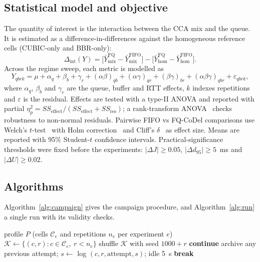 \documentclass[conference]{IEEEtran}
\newcommand{\dq}[1]{d_{#1}}
\begin{document}
\subsection{Statistical model and objective}
\label{sec:stats}
The quantity of interest is the interaction between the CCA mix and the queue. It is estimated as a difference-in-differences against the homogeneous reference cells (CUBIC-only and BBR-only):
\begin{equation}
\Delta_{\mathrm{int}}(Y) = \big[\bar{Y}_{\mathrm{mix}}^{\mathrm{FQ}} - \bar{Y}_{\mathrm{mix}}^{\mathrm{FIFO}}\big] - \big[\bar{Y}_{\mathrm{hom}}^{\mathrm{FQ}} - \bar{Y}_{\mathrm{hom}}^{\mathrm{FIFO}}\big]. \label{eq:did}
\end{equation}
Across the regime sweep, each metric is modelled as
\begin{equation}
Y_{qbrk} = \mu + \alpha_q + \beta_b + \gamma_r + (\alpha\beta)_{qb} + (\alpha\gamma)_{qr} + (\beta\gamma)_{br} + (\alpha\beta\gamma)_{qbr} + \varepsilon_{qbrk}, \label{eq:anova}
\end{equation}
where $\alpha_q$, $\beta_b$ and $\gamma_r$ are the queue, buffer and RTT effects, $k$ indexes repetitions and $\varepsilon$ is the residual. Effects are tested with a type-II ANOVA and reported with partial $\eta^2_p = SS_{\mathrm{effect}}/(SS_{\mathrm{effect}}+SS_{\mathrm{res}})$; a rank-transform ANOVA~\cite{conover1981rank} checks robustness to non-normal residuals. Pairwise FIFO vs FQ-CoDel comparisons use Welch's $t$-test~\cite{welch1947} with Holm correction~\cite{holm1979} and Cliff's $\delta$~\cite{cliff1993} as effect size. Means are reported with 95\% Student-$t$ confidence intervals. Practical-significance thresholds were fixed before the experiments: $|\Delta J|\ge0.05$, $|\Delta\dq{95}|\ge5$~ms and $|\Delta U|\ge0.02$.

\subsection{Algorithms}
Algorithm~\ref{alg:campaign} gives the campaign procedure, and Algorithm~\ref{alg:run} a single run with its validity checks.

\begin{algorithm}[t]
\caption{Campaign execution}
\label{alg:campaign}
\begin{algorithmic}[1]
\Require profile $P$ (cells $\mathcal{C}_e$ and repetitions $n_e$ per experiment $e$)
  \State $\mathcal{K} \gets \{(c,r) : c\in\mathcal{C}_e,\ r<n_e\}$
  \State shuffle $\mathcal{K}$ with seed $1000+r$ 
     \textbf{continue} 
    \EndIf
      \State archive any previous attempt; $s\gets$ 
      \State log $(c,r,\text{attempt},s)$; idle 5~s
       \textbf{break}
      \EndIf
    \EndFor
  \EndFor
\EndFor
\end{algorithmic}
\end{algorithm}
\end{document}
